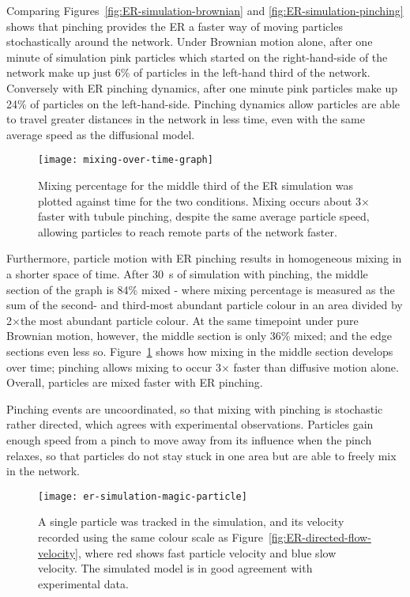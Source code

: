 Comparing Figures~\ref{fig:ER-simulation-brownian} and \ref{fig:ER-simulation-pinching} shows that pinching provides the ER a faster way of moving particles stochastically around the network. 
Under Brownian motion alone, after one minute of simulation pink particles which started on the right-hand-side of the network make up just 6\% of particles in the left-hand third of the network. 
Conversely with ER pinching dynamics, after one minute pink particles make up 24\% of particles on the left-hand-side. 
Pinching dynamics allow particles are able to travel greater distances in the network in less time, even with the same average speed as the diffusional model. 

\begin{figure}[htbp!]
	\centering
	\texttt{[image: mixing-over-time-graph]}
	\caption[ER simulation: Tubule pinching provides faster mixing than Brownian motion alone]{Mixing percentage for the middle third of the ER simulation was plotted against time for the two conditions. Mixing occurs about 3$\times$ faster with tubule pinching, despite the same average particle speed, allowing particles to reach remote parts of the network faster.}
	\label{fig:mixing-over-time-graph}
\end{figure}

Furthermore, particle motion with ER pinching results in homogeneous mixing in a shorter space of time. 
After \SI{30}{\second} of simulation with pinching, the middle section of the graph is 84\% mixed - where mixing percentage is measured as the sum of the second- and third-most abundant particle colour in an area divided by 2$\times$the most abundant particle colour. 
At the same timepoint under pure Brownian motion, however, the middle section is only 36\% mixed; and the edge sections even less so. 
Figure~\ref{fig:mixing-over-time-graph} shows how mixing in the middle section develops over time; pinching allows mixing to occur 3$\times$ faster than diffusive motion alone. 
Overall, particles are mixed faster with ER pinching. 

Pinching events are uncoordinated, so that mixing with pinching is stochastic rather directed, which agrees with experimental observations. 
Particles gain enough speed from a pinch to move away from its influence when the pinch relaxes, so that particles do not stay stuck in one area but are able to freely mix in the network. 
 
\begin{figure}[htbp!]
	\centering
	\texttt{[image: er-simulation-magic-particle]}
	\caption[ER simulation: The simulated model shows similar particle velocity tracks to experimental data]{A single particle was tracked in the simulation, and its velocity recorded using the same colour scale as Figure~\ref{fig:ER-directed-flow-velocity}, where red shows fast particle velocity and blue slow velocity. The simulated model is in good agreement with experimental data. }
	\label{fig:ER-simulation-magic-particle}
\end{figure}

